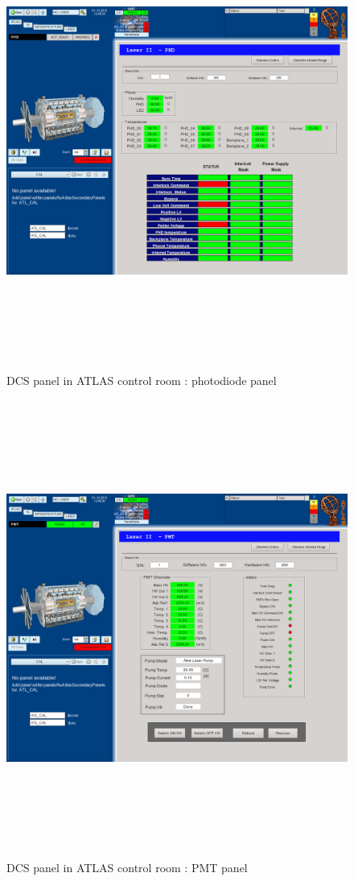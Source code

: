 \begin{appendices}
\begin{figure}[htbp]
\centering
\includegraphics[width=14cm,height=15cm]{figures/dcs_cr_phd.png}
\caption{DCS panel in ATLAS control room : photodiode panel}\label{fig:dcs_cr_b}
\end{figure}

\begin{figure}[htbp]
\centering
\includegraphics[width=14cm,height=15cm]{figures/dcs_cr_pmt.png}
\caption{DCS panel in ATLAS control room : PMT panel}\label{fig:dcs_cr_c}
\end{figure}


\end{appendices}
